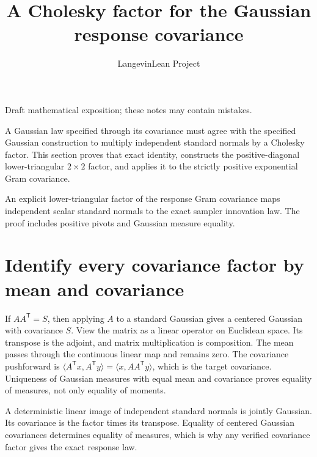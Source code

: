 \documentclass[11pt,a4paper]{article}
\title{\texorpdfstring{A Cholesky factor for the Gaussian response covariance}{A Cholesky factor for the Gaussian response covariance}}
\author{LangevinLean Project}
\date{}
\begin{document}
\maketitle
Draft mathematical exposition; these notes may contain mistakes.


A Gaussian law specified through its covariance must agree with the specified Gaussian construction to multiply independent standard normals by a Cholesky factor. This section proves that exact identity, constructs the positive-diagonal lower-triangular \(2\times2\) factor, and applies it to the strictly positive exponential Gram covariance.



An explicit lower-triangular factor of the response Gram covariance maps independent scalar standard normals to the exact sampler innovation law. The proof includes positive pivots and Gaussian measure equality.


\section{\texorpdfstring{Identify every covariance factor by mean and covariance}{Identify every covariance factor by mean and covariance}}


If \(AA^\mathsf T=S\), then applying \(A\) to a standard Gaussian gives a centered Gaussian with covariance \(S\). View the matrix as a linear operator on Euclidean space. Its transpose is the adjoint, and matrix multiplication is composition. The mean passes through the continuous linear map and remains zero. The covariance pushforward is \(\langle A^\mathsf Tx,A^\mathsf Ty\rangle=\langle x,AA^\mathsf Ty\rangle\), which is the target covariance. Uniqueness of Gaussian measures with equal mean and covariance proves equality of measures, not only equality of moments.



A deterministic linear image of independent standard normals is jointly Gaussian. Its covariance is the factor times its transpose. Equality of centered Gaussian covariances determines equality of measures, which is why any verified covariance factor gives the exact response law.
\end{document}
